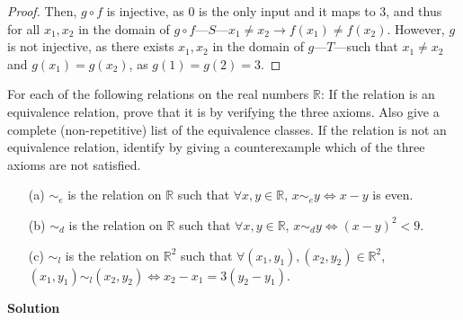 \documentclass[11pt]{scrartcl}
\theoremstyle{dotlessP}
\theoremstyle{dotlessN}
\newcommand{\comp}{\circ} %
\begin{document}
\begin{enumerate}[(a)]
\begin{proof}
		Then, $g \comp f$ is injective, as $0$ is the only input and it maps to $3$, and thus for all $x_1, x_2$ in the domain of $g \comp f$---$S$---$x_1 \neq x_2 \to f(x_1) \neq f(x_2)$. However, $g$ is not injective, as there exists $x_1, x_2$ in the domain of $g$---$T$---such that $x_1 \neq x_2$ and $g(x_1) = g(x_2)$, as $g(1) = g(2) = 3$.
	\end{proof}
\end{enumerate}

\begin{ques}
	 For each of the following relations on the real numbers $\mathbb{R}$: If the relation is an equivalence relation, prove that it is by verifying the three axioms. Also give a complete (non-repetitive) list of the equivalence classes. If the relation is not an equivalence relation, identify by giving a counterexample which of the three axioms are not satisfied. 
    \begin{itemize}
        \item[(a)] $\sim_e$ is the relation on $\mathbb{R}$ such that $\forall x,y \in \mathbb{R}$, $x \sim_e y \iff x-y$ is even.
        \item[(b)] $\sim_d$ is the relation on $\mathbb{R}$ such that $\forall x,y \in \mathbb{R}$, $x \sim_d y \iff (x-y)^2 < 9$.
        \item[(c)] $\sim_l$ is the relation on $\mathbb{R}^2$ such that $\forall (x_1,y_1),(x_2,y_2) \in \mathbb{R}^2$, $(x_1,y_1) \sim_l (x_2,y_2) \iff x_2-x_1 = 3(y_2-y_1)$.
    \end{itemize}
\end{ques}
\textbf{Solution}
\end{document}
